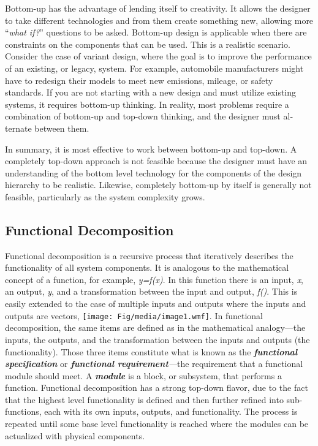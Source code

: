 Bottom-up has the advantage of lending itself to creativity. It allows
the designer to take different technologies and from them create
something new, allowing more ``\emph{what if?}'' questions to be asked.
Bottom-up design is applicable when there are constraints on the
components that can be used. This is a realistic scenario. Consider the
case of variant design, where the goal is to improve the performance of
an existing, or legacy, system. For example, automobile manufacturers
might have to redesign their models to meet new emissions, mileage, or
safety standards. If you are not starting with a new design and must
utilize existing systems, it requires bottom-up thinking. In reality,
most problems require a combination of bottom-up and top-down thinking,
and the designer must al­ternate between them.

In summary, it is most effective to work between bottom-up and top-down.
A completely top-down approach is not feasible because the designer must
have an understanding of the bottom level technology for the components
of the design hierarchy to be realistic. Likewise, com­pletely bottom-up
by itself is generally not feasible, particularly as the system
complexity grows.

\subsection{Functional Decomposition}\label{functional-decomposition}

Functional decomposition is a recursive process that iteratively
describes the functionality of all system components. It is analogous to
the mathematical concept of a function, for example, \emph{y=f(x)}. In
this function there is an input, \emph{x}, an output, \emph{y}, and a
transformation between the input and output, \emph{f()}. This is easily
extended to the case of multiple inputs and outputs where the inputs and
outputs are vectors, \texttt{[image: Fig/media/image1.wmf]}. In
functional decomposition, the same items are defined as in the
mathematical analogy---the inputs, the outputs, and the transformation
between the inputs and outputs (the functionality). Those three items
constitute what is known as the \emph{\textbf{functional specification}}
or \emph{\textbf{functional requirement}­---}the requirement that a
functional module should meet. A \emph{\textbf{module}} is a block, or
subsystem, that performs a function. Functional decomposition has a
strong top-down flavor, due to the fact that the highest level
functionality is defined and then further refined into sub-functions,
each with its own inputs, outputs, and functionality. The process is
repeated until some base level functionality is reached where the
modules can be actualized with physical components.

